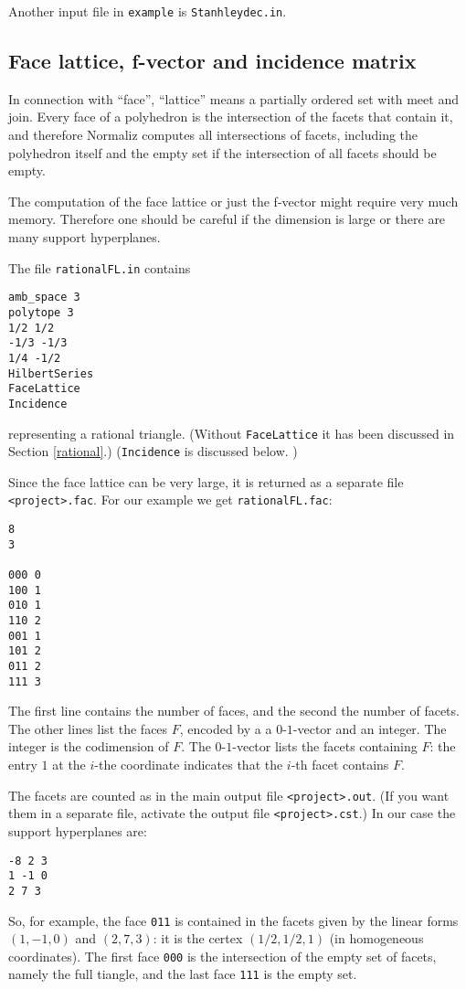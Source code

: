 \documentclass[12pt,a4paper]{scrartcl}
\theoremstyle{definition}
\begin{document}
{Another input file in \verb|example| is \verb|Stanhleydec.in|.

\subsection{Face lattice, f-vector and incidence matrix}\label{FaceLattice}

In connection with ``face'', ``lattice'' means a partially ordered set with meet and join. Every face of a polyhedron is the intersection of the facets that contain it, and therefore Normaliz computes all intersections of facets, including the polyhedron itself and the empty set if the intersection of all facets should be empty.

The computation of the face lattice or just the f-vector might require very much memory. Therefore one should be careful if the dimension is large or there are many support hyperplanes.

The file \verb|rationalFL.in| contains
\begin{Verbatim}
amb_space 3
polytope 3
1/2 1/2
-1/3 -1/3
1/4 -1/2
HilbertSeries
FaceLattice
Incidence
\end{Verbatim}
representing a rational triangle. (Without \verb|FaceLattice| it has been discussed in Section \ref{rational}.) (\verb|Incidence| is discussed below.
)

Since the face lattice can be very large, it is returned as a separate file \verb|<project>.fac|. For our example we get \verb|rationalFL.fac|:
\begin{Verbatim}
8
3

000 0
100 1
010 1
110 2
001 1
101 2
011 2
111 3
\end{Verbatim}
The first line contains the number of faces, and the second the number of facets. The other lines list the faces $F$, encoded by a a $0$-$1$-vector and an integer. The integer is the codimension of $F$.  The $0$-$1$-vector lists the facets containing $F$: the entry $1$ at the $i$-the coordinate indicates that the $i$-th facet contains $F$.

The facets are counted as in the main output file \verb|<project>.out|.  (If you want them in a separate file, activate the output file \verb|<project>.cst|.) In our case the support hyperplanes are:
\begin{Verbatim}
-8 2 3 
1 -1 0 
2 7 3
\end{Verbatim}
So, for example, the face \verb|011| is contained in the facets  given by the linear forms $(1,-1,0)$ and 
$(2, 7,3)$: it is the certex $(1/2,1/2,1)$ (in homogeneous coordinates). The first face \verb|000| is the intersection of the empty set of facets, namely the full tiangle, and the last face \verb|111| is the empty set.

}
\end{document}
